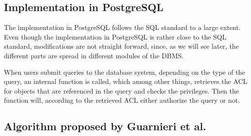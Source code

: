 
\subsection{Implementation in PostgreSQL} 

The implementation in PostgreSQL follows the SQL standard to a large extent. 
%
Even though the implementation in PostgreSQL is rather close to the SQL standard, modifications are not straight forward, since, as we will see later, the different parts are spread in different modules of the DBMS.

When users submit queries to the database system, depending on the type of the query, an internal function is called, which among other things, retrieves the ACL for objects that are referenced in the query and checks the privileges.
%
Then the function will, according to the retrieved ACL either authorize the query or not.

\subsection{Algorithm proposed by Guarnieri et al.}


